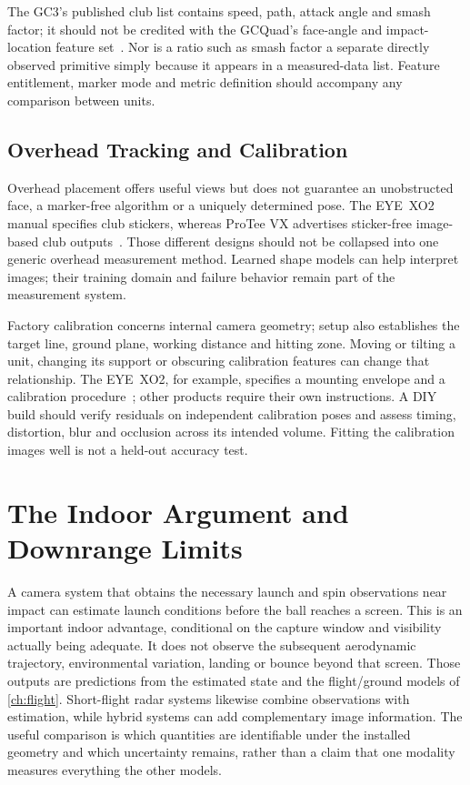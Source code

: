 The GC3's published club list contains speed, path, attack angle and smash factor; it should not be credited with the GCQuad's face-angle and impact-location feature set~\cite{foresightgc3}.
Nor is a ratio such as smash factor a separate directly observed primitive simply because it appears in a measured-data list.
Feature entitlement, marker mode and metric definition should accompany any comparison between units.

\subsection{Overhead Tracking and Calibration}

Overhead placement offers useful views but does not guarantee an unobstructed face, a marker-free algorithm or a uniquely determined pose.
The EYE~XO2 manual specifies club stickers, whereas ProTee VX advertises sticker-free image-based club outputs~\cite{uneekorxo2manual,proteevx}.
Those different designs should not be collapsed into one generic overhead measurement method.
Learned shape models can help interpret images; their training domain and failure behavior remain part of the measurement system.

Factory calibration concerns internal camera geometry; setup also establishes the target line, ground plane, working distance and hitting zone.
Moving or tilting a unit, changing its support or obscuring calibration features can change that relationship.
The EYE~XO2, for example, specifies a mounting envelope and a calibration procedure~\cite{uneekorxo2manual}; other products require their own instructions.
A DIY build should verify residuals on independent calibration poses and assess timing, distortion, blur and occlusion across its intended volume.
Fitting the calibration images well is not a held-out accuracy test.

\section{The Indoor Argument and Downrange Limits}

A camera system that obtains the necessary launch and spin observations near impact can estimate launch conditions before the ball reaches a screen.
This is an important indoor advantage, conditional on the capture window and visibility actually being adequate.
It does not observe the subsequent aerodynamic trajectory, environmental variation, landing or bounce beyond that screen.
Those outputs are predictions from the estimated state and the flight/ground models of \cref{ch:flight}.
Short-flight radar systems likewise combine observations with estimation, while hybrid systems can add complementary image information.
The useful comparison is which quantities are identifiable under the installed geometry and which uncertainty remains, rather than a claim that one modality measures everything the other models.

